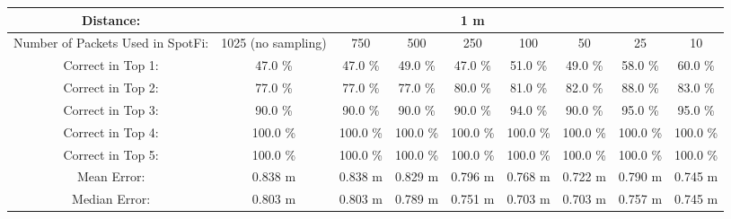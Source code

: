 \begin{tabular}{| c || c | c | c | c | c | c | c | c |}
\hline
Distance: &  &  &  & 1 m  &  &  &  &  \\
\hline
Number of Packets Used in SpotFi: & 1025 (no sampling) & 750 & 500 & 250 & 100 & 50 & 25 & 10 \\
\hline
\hline
Correct in Top 1: & 47.0 \% & 47.0 \% & 49.0 \% & 47.0 \% & 51.0 \% & 49.0 \% & 58.0 \% & 60.0 \% \\
\hline
Correct in Top 2: & 77.0 \% & 77.0 \% & 77.0 \% & 80.0 \% & 81.0 \% & 82.0 \% & 88.0 \% & 83.0 \% \\
\hline
Correct in Top 3: & 90.0 \% & 90.0 \% & 90.0 \% & 90.0 \% & 94.0 \% & 90.0 \% & 95.0 \% & 95.0 \% \\
\hline
Correct in Top 4: & 100.0 \% & 100.0 \% & 100.0 \% & 100.0 \% & 100.0 \% & 100.0 \% & 100.0 \% & 100.0 \% \\
\hline
Correct in Top 5: & 100.0 \% & 100.0 \% & 100.0 \% & 100.0 \% & 100.0 \% & 100.0 \% & 100.0 \% & 100.0 \% \\
\hline
\hline
Mean Error: & 0.838 m & 0.838 m & 0.829 m & 0.796 m & 0.768 m & 0.722 m & 0.790 m & 0.745 m \\
\hline
Median Error: & 0.803 m & 0.803 m & 0.789 m & 0.751 m & 0.703 m & 0.703 m & 0.757 m & 0.745 m \\
\hline
\end{tabular}